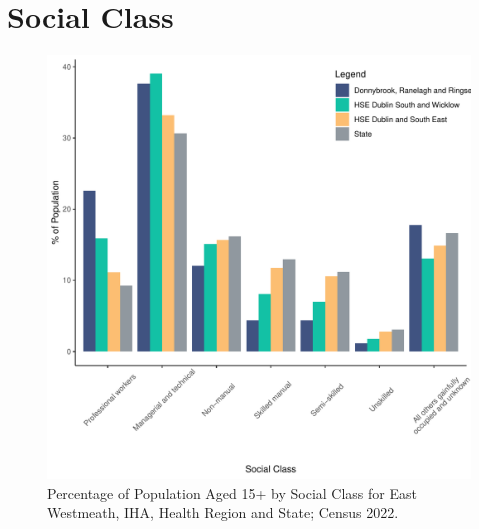 \documentclass{article}
\begin{document}
\section{Social Class}\label{sect:SC}
\begin{figure}[H]
	\centering
	\includegraphics[width = 140mm]{../figures/SocialClassED.pdf}
	\caption{Percentage of Population Aged 15+ by Social Class for East Westmeath, IHA, Health Region and State; Census 2022.}
	\label{fig:vbnv}
	\end{figure}
\end{document}
